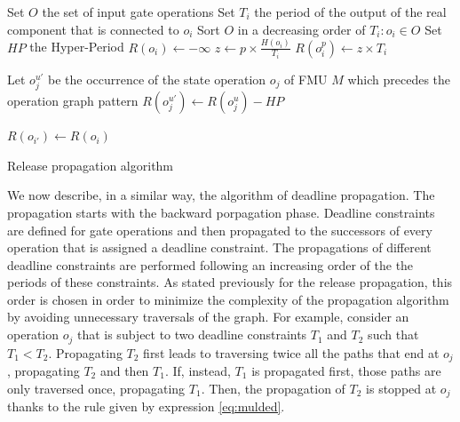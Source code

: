 \begin{algorithm}[!htp]	
	 Set $O$ the set of input gate operations\;
	 Set $T_i$ the period of the output of the real component that is connected to $o_i$\;
	 Sort $O$ in a decreasing order of $T_i: o_i \in O$\;
	 Set $HP$ the Hyper-Period\;
	{
	  $R(o_i) \leftarrow -\infty$\;
	}
	{
		{
		  $z \leftarrow p \times \frac{H(o_i)}{T_i}$\;
			$R(o_i^p) \leftarrow z \times T_i$\;
			\;	
		}
	}
	
	
	{
		  Let $o_j^{u'}$ be the occurrence of the state operation $o_j$ of FMU $M$ which precedes the operation graph pattern\;
			$R(o_j^{u'}) \leftarrow R(o_j^u) - HP$\;
			\;	
	}
		
		{
			{
			{
				{
					$R(o_{i'}) \leftarrow R(o_i)$\;
					\;
				}
			}
			}
			\KwRet\;
		}
	\caption{Release propagation algorithm}
	\label{algo:release}
\end{algorithm} 

We now describe, in a similar way, the algorithm of deadline propagation. The propagation starts with the backward porpagation phase. Deadline constraints are defined for gate operations and then propagated to the successors of every operation that is assigned a deadline constraint. The propagations of different deadline constraints are performed following an increasing order of the the periods of these constraints. As stated previously for the release propagation, this order is chosen in order to minimize the complexity of the propagation algorithm by avoiding unnecessary traversals of the graph. For example, consider an operation $o_j$ that is subject to two deadline constraints $T_1$ and $T_2$ such that $T_1 < T_2$. Propagating $T_2$ first leads to traversing twice all the paths that end at $o_j$, propagating $T_2$ and then $T_1$. If, instead, $T_1$ is propagated first, those paths are only traversed once, propagating $T_1$. Then, the propagation of $T_2$ is stopped at $o_j$ thanks to the rule given by expression \ref{eq:mulded}.

